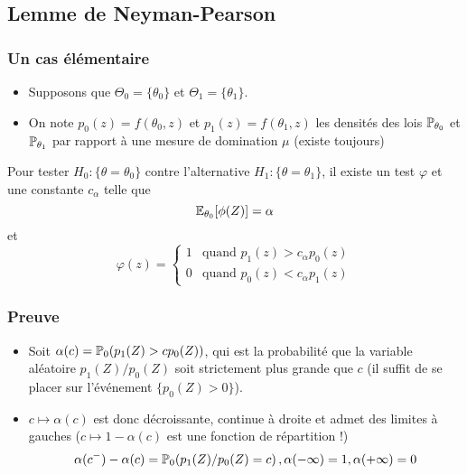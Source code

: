 \subsection{Lemme de Neyman-Pearson}

\begin{frame}
\frametitle{Un cas élémentaire}
\begin{itemize}
\item Supposons que $\Theta_0 = \{\theta_0\}$ et $\Theta_1=\{ \theta_1 \}$.
\item On note $p_0(z)= f(\theta_0,z)$ et $p_1(z)= f(\theta_1,z)$ les densités des lois $\operatorname{{\mathbb P}}_{\theta_0}$ et $\operatorname{{\mathbb P}}_{\theta_1}$ par rapport à une mesure de domination $\mu$ (existe toujours)
\end{itemize}
\begin{theorem}
 Pour tester $H_0: \{\theta = \theta_0\}$ contre l'alternative $H_1 : \{\theta = \theta_1\}$, il existe un test $\varphi$ et une constante $c_\alpha$ telle que
$$
\operatorname{{\mathbb E}}_{\theta_0}[\phi(Z)]= \alpha
$$
et 
\[
\varphi(z)= 
\begin{cases}
1 & \text{quand $p_1(z) > c_\alpha p_0(z)$} \\
0 & \text{quand $p_0(z) < c_\alpha p_1(z)$}
\end{cases}
\]
\end{theorem}
\end{frame}

\begin{frame}
\frametitle{Preuve}
\begin{itemize}
\item Soit $\alpha(c)= \operatorname{{\mathbb P}}_0( p_1(Z) > c p_0(Z))$, qui est la probabilité que la variable aléatoire $p_1(Z)/p_0(Z)$ soit strictement plus grande que $c$ (il suffit de se placer sur l'événement $\{p_0(Z) > 0 \}$).
\item $c \mapsto \alpha(c)$ est donc décroissante, continue à droite et admet des limites à gauches ($c \mapsto 1 - \alpha(c)$ est une fonction de répartition !)
$$
\alpha(c^-) - \alpha(c) = \operatorname{{\mathbb P}}_0( p_1(Z)/p_0(Z) = c) \,, \alpha(-\infty)= 1, \alpha(+\infty)=0
$$
\end{itemize}
\end{frame}

